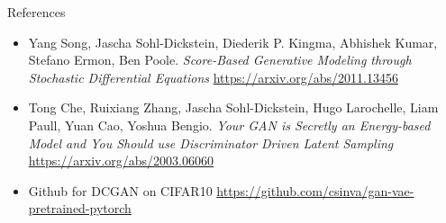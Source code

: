 \documentclass[xcolor=dvipsnames]{beamer}
\begin{document}
    \begin{frame}{References}
        \begin{itemize}
            \item Yang Song, Jascha Sohl-Dickstein, Diederik P. Kingma, Abhishek Kumar, Stefano Ermon, Ben Poole. \textit{Score-Based Generative Modeling through Stochastic Differential Equations} \url{https://arxiv.org/abs/2011.13456}            
            \item Tong Che, Ruixiang Zhang, Jascha Sohl-Dickstein, Hugo Larochelle, Liam Paull, Yuan Cao, Yoshua Bengio. \textit{Your GAN is Secretly an Energy-based Model and You Should use Discriminator Driven Latent Sampling}  \url{https://arxiv.org/abs/2003.06060}
            \item Github for DCGAN on CIFAR10 \url{https://github.com/csinva/gan-vae-pretrained-pytorch}
        \end{itemize}
    \end{frame}

    
\end{document}
